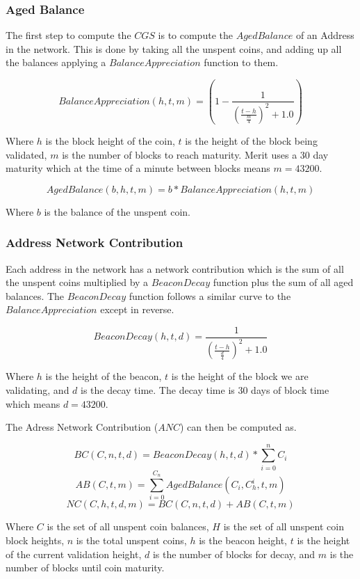 \documentclass{article}
\begin{document}
\subsubsection{Aged Balance}

The first step to compute the $CGS$ is to compute the $AgedBalance$ of an Address
in the network. This is done by taking all the unspent coins, and adding up all the
balances applying a $BalanceAppreciation$ function to them.

$$BalanceAppreciation(h,t,m) = (1 - \frac{1}{(\frac{t-h}{\frac{m}{4}})^2 + 1.0})$$

Where $h$ is the block height of the coin, $t$ is the height
of the block being validated, $m$ is the number of blocks to reach maturity. Merit
uses a 30 day maturity which at the time of a minute between blocks means $m = 43200$.

$$AgedBalance(b,h,t,m) = b * BalanceAppreciation(h,t,m)$$

Where $b$ is the balance of the unspent coin.

\subsubsection{Address Network Contribution}

Each address in the network has a network contribution which is the sum of all
the unspent coins multiplied by a $BeaconDecay$ function plus the sum of all
aged balances. The $BeaconDecay$ function follows a similar curve to the $BalanceAppreciation$
except in reverse.

$$BeaconDecay(h,t,d) = \frac{1}{(\frac{t-h}{\frac{d}{4}})^2 + 1.0}$$

Where $h$ is the height of the beacon, $t$ is the height of the block we are validating,
and $d$ is the decay time. The decay time is 30 days of block time which means $d = 43200$.

The Adress Network Contribution ($ANC$) can then be computed as.

$$BC(C,n,t,d)= BeaconDecay(h,t,d) * \sum_{i=0}^{n} C_i$$
$$AB(C,t,m) = \sum_{i=0}^{C_n} AgedBalance(C_i,C_h^i,t,m)$$
$$NC(C,h,t,d,m) =  BC(C,n,t,d) + AB(C,t,m)$$

Where $C$ is the set of all unspent coin balances, $H$ is the set of all unspent
coin block heights, $n$ is the total unspent coins, $h$ is the beacon height, $t$
is the height of the current validation height, $d$ is the number of blocks for
decay, and $m$ is the number of blocks until coin maturity.
\end{document}
